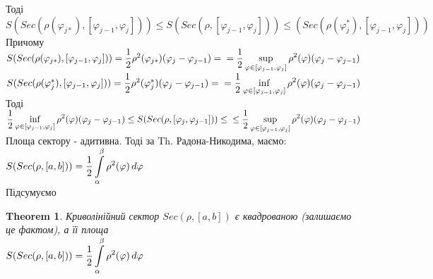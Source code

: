 \documentclass[a4paper, 14pt]{extarticle}
\def\huge{\displaystyle}
\def\bigline{\vspace{5mm}\\}
\theoremstyle{theoremdd}
\newtheorem{theorem}{Theorem}[subsection]
\theoremstyle{theoremdd}
\theoremstyle{theoremdd}
\theoremstyle{theoremdd}
\theoremstyle{theoremdd}
\theoremstyle{theoremdd}
\theoremstyle{theoremdd}
\theoremstyle{theoremdd}
\begin{document}
Тоді\\
$S(Sec(\rho(\varphi_{j*}), [\varphi_{j-1}, \varphi_j])) \leq S(Sec(\rho, [\varphi_{j-1}, \varphi_j])) \leq (Sec(\rho(\varphi^*_{j}), [\varphi_{j-1}, \varphi_j]))$\\
Причому \\ 
$S(Sec(\rho(\varphi_{j*}), [\varphi_{j-1}, \varphi_j])) = \dfrac{1}{2} \rho^2(\varphi_{j*}) (\varphi_{j} - \varphi_{j-1}) = \\ = \dfrac{1}{2} \huge \sup_{\varphi \in [\varphi_{j-1}, \varphi_j]} \rho^2(\varphi) (\varphi_{j} - \varphi_{j-1})$\\
$S(Sec(\rho(\varphi^*_{j}), [\varphi_{j-1}, \varphi_j])) = \dfrac{1}{2} \rho^2(\varphi^*_{j}) (\varphi_{j} - \varphi_{j-1}) = \\ = \dfrac{1}{2} \huge \inf_{\varphi \in [\varphi_{j-1}, \varphi_j]} \rho^2(\varphi) (\varphi_{j} - \varphi_{j-1})$\\
Тоді\\
$\huge \dfrac{1}{2} \inf_{\varphi \in [\varphi_{j-1}, \varphi_j]} \rho^2(\varphi) (\varphi_{j} - \varphi_{j-1}) \leq S(Sec(\rho, [\varphi_{j},\varphi_{j-1}])) \leq \\ \leq \dfrac{1}{2} \sup_{\varphi \in [\varphi_{j-1}, \varphi_j]} \rho^2(\varphi) (\varphi_{j} - \varphi_{j-1})$\\
Площа сектору - адитивна. Тоді за Th. Радона-Никодима, маємо:\\
$S(Sec(\rho, [a,b])) = \dfrac{1}{2} \huge \int\displaylimits_\alpha^\beta \rho^2(\varphi)\,d\varphi$
\bigline
Підсумуємо
\begin{theorem}
Криволінійний сектор $Sec(\rho, [a,b])$ є квадрованою (залишаємо це фактом), а її площа\\
$S(Sec(\rho, [a,b])) = \dfrac{1}{2} \huge \int\displaylimits_\alpha^\beta \rho^2(\varphi)\,d\varphi$
\bigline
\end{theorem}
\end{document}
